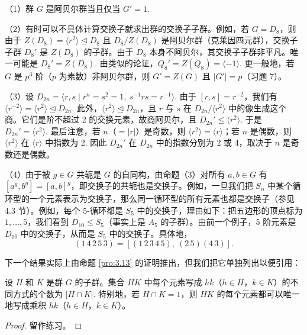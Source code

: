 \begin{example}
（1）群 \(G\) 是阿贝尔群当且仅当 \(G' = 1\).

（2）有时可以不具体计算交换子就求出群的交换子子群。例如，若 \(G = D_8\)，则由于 \(Z(D_8) = \langle r^2 \rangle \trianglelefteq D_8\) 且 \(D_8/Z(D_8)\) 是阿贝尔群（克莱因四元群），交换子子群 \(D_8'\) 是 \(Z(D_8)\) 的子群。由于 \(D_8\) 本身不阿贝尔，其交换子子群非平凡。唯一可能是 \(D_8' = Z(D_8)\). 由类似的论证，\(Q_8' = Z(Q_8) = \langle -1 \rangle\). 更一般地，若 \(G\) 是 \(p^3\) 阶（\(p\) 为素数）非阿贝尔群，则 \(G' = Z(G)\) 且 \(|G'| = p\)（习题 7）。

（3）设 \(D_{2n} = \langle r, s \mid r^n = s^2 = 1,\ s^{-1}rs = r^{-1} \rangle\). 由于 \([r, s] = r^{-2}\)，我们有 \(\langle r^{-2} \rangle = \langle r^2 \rangle \trianglelefteq D_{2n}\). 此外，\(\langle r^2 \rangle \trianglelefteq D_{2n}\)，且 \(r\) 与 \(s\) 在 \(D_{2n}/\langle r^2 \rangle\) 中的像生成这个商。它们是阶不超过 2 的交换元素，故商阿贝尔，且 \(D_{2n}' \leq \langle r^2 \rangle\). 于是 \(D_{2n}' = \langle r^2 \rangle\). 最后注意，若 \(n\)（\(= |r|\)）是奇数，则 \(\langle r^2 \rangle = \langle r \rangle\)；若 \(n\) 是偶数，则 \(\langle r^2 \rangle\) 在 \(\langle r \rangle\) 中指数为 2. 因此 \(D_{2n}'\) 在 \(D_{2n}\) 中的指数分别为 2 或 4，取决于 \(n\) 是奇数还是偶数。

（4）由于被 \(g \in G\) 共轭是 \(G\) 的自同构，由命题（3）对所有 \(a, b \in G\) 有 \([a^g, b^g] = [a, b]^g\)，即交换子的共轭也是交换子。例如，一旦我们把 \(S_n\) 中某个循环型的一个元素表示为交换子，那么同一循环型的所有元素也都是交换子（参见 4.3 节）。例如，每个 5-循环都是 \(S_5\) 中的交换子，理由如下：把五边形的顶点标为 \(1, \ldots, 5\)，我们看到 \(D_{10} \leq S_5\)（事实上是 \(A_5\) 的子群）。由前一个例子，5 阶元素是 \(D_{10}\) 中的交换子，从而是 \(S_5\) 中的交换子。具体地，
\[
(1\,4\,2\,5\,3) = [(1\,2\,3\,4\,5),\ (2\,5)(4\,3)].
\]
\end{example}

下一个结果实际上由命题 \ref{pro:3.13} 的证明推出，但我们把它单独列出以便引用：

\begin{proposition}\label{pro:5.8}
设 \(H\) 和 \(K\) 是群 \(G\) 的子群。集合 \(HK\) 中每个元素写成 \(hk\)（\(h \in H\)，\(k \in K\)）的不同方式的个数为 \(|H \cap K|\). 特别地，若 \(H \cap K = 1\)，则 \(HK\) 的每个元素都可以唯一地写成乘积 \(hk\)（\(h \in H\)，\(k \in K\)）。
\end{proposition}

\begin{proof}
留作练习。
\end{proof}

